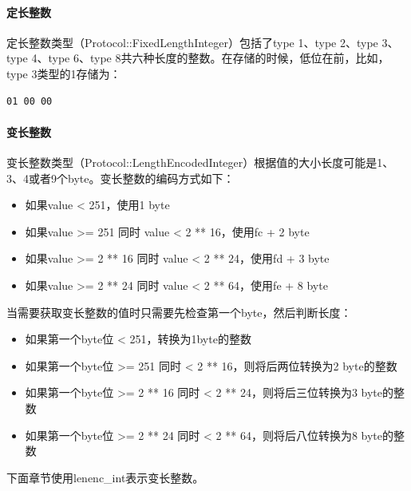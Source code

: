 \documentclass[a4paper, titlepage, 10pt, bookmark]{article}
\begin{document}
\paragraph{定长整数}
定长整数类型（Protocol::FixedLengthInteger）包括了type 1、type 2、type 3、type 4、type 6、type 8共六种长度的整数。在存储的时候，低位在前，比如，type 3类型的1存储为：
\begin{spacing}{1.0}
\begin{lstlisting}
01 00 00
\end{lstlisting}
\end{spacing}

\paragraph{变长整数}
变长整数类型（Protocol::LengthEncodedInteger）根据值的大小长度可能是1、3、4或者9个byte。变长整数的编码方式如下：
\begin{itemize}
    \item 如果value < 251，使用1 byte
    \item 如果value >= 251 同时 value < 2 ** 16，使用fc + 2 byte
    \item 如果value >= 2 ** 16 同时 value < 2 ** 24，使用fd + 3 byte
    \item 如果value >= 2 ** 24 同时 value < 2 ** 64，使用fe + 8 byte
\end{itemize}

当需要获取变长整数的值时只需要先检查第一个byte，然后判断长度：
\begin{itemize}
    \item 如果第一个byte位 < 251，转换为1byte的整数
    \item 如果第一个byte位 >= 251 同时 < 2 ** 16，则将后两位转换为2 byte的整数
    \item 如果第一个byte位 >= 2 ** 16 同时 < 2 ** 24，则将后三位转换为3 byte的整数
    \item 如果第一个byte位 >= 2 ** 24 同时 < 2 ** 64，则将后八位转换为8 byte的整数
\end{itemize}

下面章节使用lenenc\_int表示变长整数。
\end{document}
